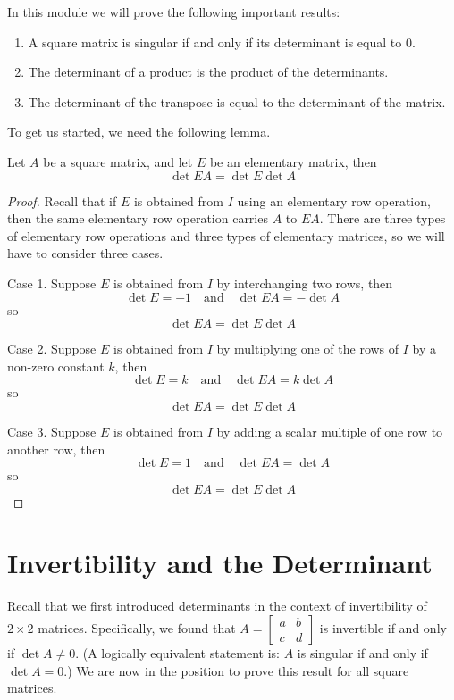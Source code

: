\documentclass{ximera}
\begin{document}
In this module we will prove the following important results:
\begin{enumerate}
\item A square matrix is singular if and only if its determinant is equal to 0.
\item The determinant of a product is the product of the determinants.
\item The determinant of the transpose is equal to the determinant of the matrix.
\end{enumerate}
To get us started, we need the following lemma.
\begin{lemma}\label{lemma:detelemproduct} Let $A$ be a square matrix, and let $E$ be an elementary matrix, then
$$\det{EA}=\det{E}\det{A}$$
\end{lemma}
\begin{proof} Recall that if $E$ is obtained from $I$ using an elementary row operation, then the same elementary row operation carries $A$ to $EA$.  There are three types of elementary row operations and three types of elementary matrices, so we will have to consider three cases.

Case 1.  Suppose $E$ is obtained from $I$ by interchanging two rows, then
$$\det{E}=-1\quad\text{and}\quad \det{EA}=-\det{A}$$
so
$$\det{EA}=\det{E}\det{A}$$

Case 2.  Suppose $E$ is obtained from $I$ by multiplying one of the rows of $I$ by a non-zero constant $k$, then
$$\det{E}=k\quad\text{and}\quad \det{EA}=k\det{A}$$
so
$$\det{EA}=\det{E}\det{A}$$

Case 3.  Suppose $E$ is obtained from $I$ by adding a scalar multiple of one row to another row, then
$$\det{E}=1\quad\text{and}\quad \det{EA}=\det{A}$$
so
$$\det{EA}=\det{E}\det{A}$$
\end{proof}
\section*{Invertibility and the Determinant}
Recall that we first introduced determinants in the context of invertibility of $2\times 2$ matrices. Specifically, we found that $A=\begin{bmatrix}a&b\\c&d\end{bmatrix}$ is invertible if and only if $\det{A}\neq 0$.  (A logically equivalent statement is: $A$ is singular if and only if $\det{A}=0$.)   We are now in the position to prove this result for all square matrices.
\end{document}

